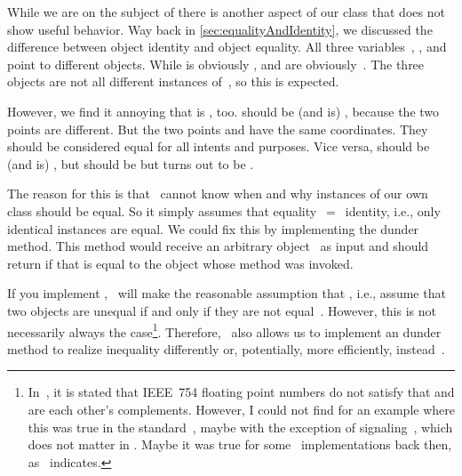 While we are on the subject of  there is another aspect of our  class that does not show useful behavior.
Way back in \cref{sec:equalityAndIdentity}, we discussed the difference between object identity and object equality.
All three variables~, , and~ point to different objects.
While  is obviously ,  and  are obviously~.
The three objects are not all different instances of~, so this is expected.

However, we find it annoying that \pythonIdx{==} is , too.
 should be (and is) , because the two points are different.
But the two points  and  have the same coordinates.
They should be considered equal for all intents and purposes.
Vice versa,  should be (and is) , but  should be  but turns out to be .

The reason for this is that \python\ cannot know when and why instances of our own class should be equal.
So it simply assumes that equality~$=$~identity, i.e., only identical instances are equal.
We could fix this by implementing the  dunder method.
This method would receive an arbitrary object~ as input and should return  if that is equal to the object whose method was invoked.

If you implement , \python\ will make the reasonable assumption that \pythonIdx{==}, i.e., assume that two objects are unequal if and only if they are not equal~\cite{PEP207}.
However, this is not necessarily always the case\footnote{%
In~\cite{PEP207}, it is stated that IEEE~754 floating point numbers do not satisfy that \pythonilIdx{==} and \pythonil{!=} are each other's complements. %
However, I could not find for an example where this was true in the standard~\cite{IEEE2019ISFFPA}, maybe with the exception of signaling~, which does not matter in \python. %
Maybe it was true for some \python\ implementations back then, as~\cite{PEP754} indicates.%
}. %
Therefore, \python\ also allows us to implement an  dunder method to realize inequality differently or, potentially, more efficiently, instead~\cite{PEP207}.

